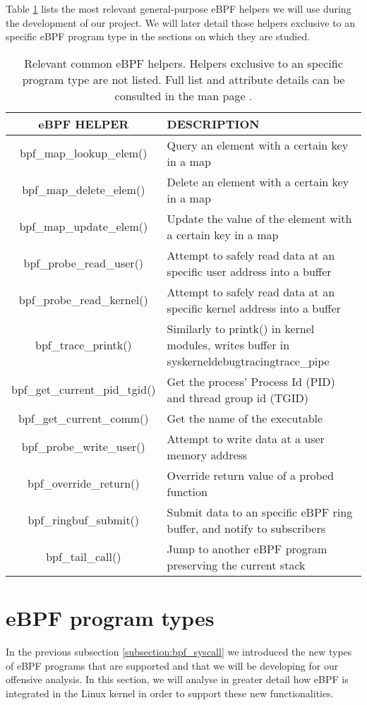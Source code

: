 Table \ref{table:ebpf_helpers} lists the most relevant general-purpose eBPF helpers we will use during the development of our project. We will later detail those helpers exclusive to an specific eBPF program type in the sections on which they are studied.

\begin{table}[htbp]
\begin{tabular}{|c|>{\centering\arraybackslash}p{8cm}|}
\hline
\textbf{eBPF HELPER}& \textbf{DESCRIPTION}\\
\hline
\hline
bpf\_map\_lookup\_elem() & Query an element with a certain key in a map\\
\hline
bpf\_map\_delete\_elem() & Delete an element with a certain key in a map\\
\hline
bpf\_map\_update\_elem() & Update the value of the element with a certain key in a map\\
\hline
bpf\_probe\_read\_user() & Attempt to safely read data at an specific user address into a buffer\\
\hline
bpf\_probe\_read\_kernel() & Attempt to safely read data at an specific kernel address into a buffer\\
\hline
bpf\_trace\_printk() & Similarly to printk() in kernel modules, writes buffer in \/sys\/kernel\/debug\/tracing\/trace\_pipe\\
\hline
bpf\_get\_current\_pid\_tgid() & Get the process' Process Id (PID) and thread group id (TGID)\\
\hline
bpf\_get\_current\_comm() & Get the name of the executable\\
\hline
bpf\_probe\_write\_user() & Attempt to write data at a user memory address\\
\hline
bpf\_override\_return() & Override return value of a probed function\\
\hline
bpf\_ringbuf\_submit() & Submit data to an specific eBPF ring buffer, and notify to subscribers\\
\hline
bpf\_tail\_call() & Jump to another eBPF program preserving the current stack\\
\hline
\end{tabular}
\caption{Relevant common eBPF helpers. Helpers exclusive to an specific program type are not listed. Full list and attribute details can be consulted in the man page \cite{ebpf_helpers}.}
\label{table:ebpf_helpers}
\end{table}


\section{eBPF program types} \label{section:ebpf_prog_types}
In the previous subsection \ref{subsection:bpf_syscall} we introduced the new types of eBPF programs that are supported and that we will be developing for our offensive analysis. In this section, we will analyse in greater detail how eBPF is integrated in the Linux kernel in order to support these new functionalities.

